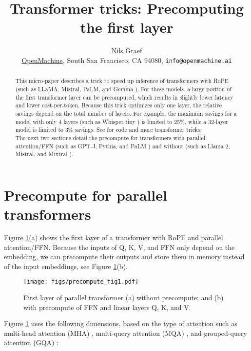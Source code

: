 \documentclass{article}
\title{Transformer tricks: Precomputing the first layer}
\author{Nils Graef \\ \href{https://openmachine.ai}{OpenMachine},
  South San Francisco, CA 94080, \texttt{info@openmachine.ai}}
\begin{document}
 \maketitle

\begin{abstract}
This micro-paper \cite{micro-paper} describes a trick to speed up inference of transformers with RoPE \citep{RoPE} (such as LLaMA, Mistral, PaLM, and Gemma \citep{gemma}). For these models, a large portion of the first transformer layer can be precomputed, which results in slightly lower latency and lower cost-per-token.
Because this trick optimizes only one layer, the relative savings depend on the total number of layers. For example, the maximum savings for a model with only 4 layers (such as Whisper tiny \citep{Whisper}) is limited to 25\%, while a 32-layer model is limited to 3\% savings. See \citep{tricks} for code and more transformer tricks. \\
The next two sections detail the precompute for transformers with parallel attention/FFN \citep{parallel} (such as GPT-J, Pythia, and PaLM \citep{parallel, Pythia, PaLM}) and without (such as Llama 2, Mistral, and Mixtral \citep{LLaMA, Llama2, Mistral, Mixtral}).
\end{abstract}

\section{Precompute for parallel transformers}
Figure \ref{fig1}(a) shows the first layer of a transformer with RoPE and parallel attention/FFN. Because the inputs of Q, K, V, and FFN only depend on the embedding, we can precompute their outputs and store them in memory instead of the input embeddings, see Figure \ref{fig1}(b).

\begin{figure}[h!] \centering  %
  \texttt{[image: figs/precompute\_fig1.pdf]}
  \caption{First layer of parallel transformer (a) without precompute; and (b) with precompute of FFN and linear layers Q, K, and V.}
 \label{fig1} \end{figure}

Figure \ref{fig1} uses the following dimensions, based on the type of attention such as multi-head attention (MHA) \citep{vanilla}, multi-query attention (MQA) \citep{MQA}, and grouped-query attention (GQA) \citep{GQA}:
\end{document}

